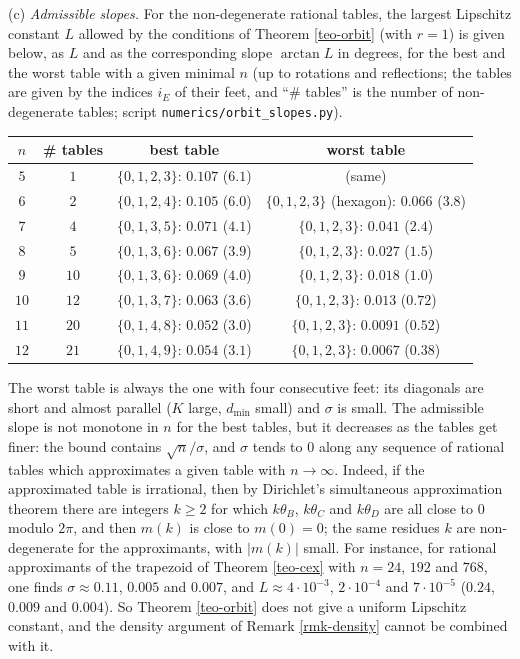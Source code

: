 \documentclass[a4paper,11pt,twoside,leqno]{article}
\numberwithin{equation}{section}
\begin{document}
\begin{rmk}
(c) \emph{Admissible slopes.} For the non-degenerate rational tables, the largest Lipschitz constant $L$ allowed by the conditions of Theorem \ref{teo-orbit} (with $r=1$) is given below, as $L$ and as the corresponding slope $\arctan L$ in degrees, for the best and the worst table with a given minimal $n$ (up to rotations and reflections; the tables are given by the indices $i_E$ of their feet, and ``\# tables'' is the number of non-degenerate tables; script \texttt{numerics/orbit\_slopes.py}).
\begin{center}\small
\begin{tabular}{c|c|c|c}
$n$ & \# tables & best table & worst table \\ \hline
$5$ & $1$ & $\{0,1,2,3\}$: $0.107$ ($6.1$\textdegree{}) & (same) \\
$6$ & $2$ & $\{0,1,2,4\}$: $0.105$ ($6.0$\textdegree{}) & $\{0,1,2,3\}$ (hexagon): $0.066$ ($3.8$\textdegree{}) \\
$7$ & $4$ & $\{0,1,3,5\}$: $0.071$ ($4.1$\textdegree{}) & $\{0,1,2,3\}$: $0.041$ ($2.4$\textdegree{}) \\
$8$ & $5$ & $\{0,1,3,6\}$: $0.067$ ($3.9$\textdegree{}) & $\{0,1,2,3\}$: $0.027$ ($1.5$\textdegree{}) \\
$9$ & $10$ & $\{0,1,3,6\}$: $0.069$ ($4.0$\textdegree{}) & $\{0,1,2,3\}$: $0.018$ ($1.0$\textdegree{}) \\
$10$ & $12$ & $\{0,1,3,7\}$: $0.063$ ($3.6$\textdegree{}) & $\{0,1,2,3\}$: $0.013$ ($0.72$\textdegree{}) \\
$11$ & $20$ & $\{0,1,4,8\}$: $0.052$ ($3.0$\textdegree{}) & $\{0,1,2,3\}$: $0.0091$ ($0.52$\textdegree{}) \\
$12$ & $21$ & $\{0,1,4,9\}$: $0.054$ ($3.1$\textdegree{}) & $\{0,1,2,3\}$: $0.0067$ ($0.38$\textdegree{})
\end{tabular}
\end{center}
The worst table is always the one with four consecutive feet: its diagonals are short and almost parallel ($K$ large, $d_{\min}$ small) and $\sigma$ is small. The admissible slope is not monotone in $n$ for the best tables, but it decreases as the tables get finer: the bound contains $\sqrt{n}/\sigma$, and $\sigma$ tends to $0$ along any sequence of rational tables which approximates a given table with $n \to \infty$. Indeed, if the approximated table is irrational, then by Dirichlet's simultaneous approximation theorem there are integers $k \geq 2$ for which $k\theta_B$, $k\theta_C$ and $k\theta_D$ are all close to $0$ modulo $2\pi$, and then $m(k)$ is close to $m(0) = 0$; the same residues $k$ are non-degenerate for the approximants, with $|m(k)|$ small. For instance, for rational approximants of the trapezoid of Theorem \ref{teo-cex} with $n = 24$, $192$ and $768$, one finds $\sigma \approx 0.11$, $0.005$ and $0.007$, and $L \approx 4\cdot 10^{-3}$, $2\cdot 10^{-4}$ and $7 \cdot 10^{-5}$ ($0.24$\textdegree{}, $0.009$\textdegree{} and $0.004$\textdegree{}). So Theorem \ref{teo-orbit} does not give a uniform Lipschitz constant, and the density argument of Remark \ref{rmk-density} cannot be combined with it.


\end{rmk}
\end{document}
